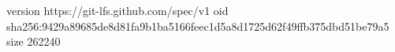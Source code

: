 version https://git-lfs.github.com/spec/v1
oid sha256:9429a89685de8d81fa9b1ba5166feec1d5a8d1725d62f49ffb375dbd51be79a5
size 262240
